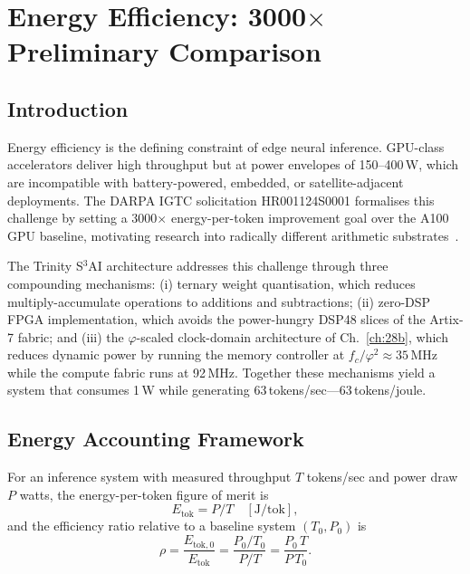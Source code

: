 \chapter{Energy Efficiency: 3000$\times$ Preliminary Comparison}
\label{ch:34}

\section{Introduction}

Energy efficiency is the defining constraint of edge neural inference. GPU-class accelerators deliver high throughput but at power envelopes of 150--400\,W, which are incompatible with battery-powered, embedded, or satellite-adjacent deployments. The DARPA IGTC solicitation HR001124S0001 formalises this challenge by setting a 3000$\times$ energy-per-token improvement goal over the A100 GPU baseline, motivating research into radically different arithmetic substrates~\cite{darpa_igtc_2024}.

The Trinity S$^3$AI architecture addresses this challenge through three compounding mechanisms: (i) ternary weight quantisation, which reduces multiply-accumulate operations to additions and subtractions; (ii) zero-DSP FPGA implementation, which avoids the power-hungry DSP48 slices of the Artix-7 fabric; and (iii) the $\varphi$-scaled clock-domain architecture of Ch.~\ref{ch:28b}, which reduces dynamic power by running the memory controller at $f_c/\varphi^2 \approx 35$\,MHz while the compute fabric runs at 92\,MHz. Together these mechanisms yield a system that consumes 1\,W while generating 63\,tokens/sec---63\,tokens/joule.

\section{Energy Accounting Framework}

\begin{definition}
\label{def:energy-per-token}
For an inference system with measured throughput $T$ tokens/sec and power draw $P$ watts, the energy-per-token figure of merit is
\begin{equation}
E_{\mathrm{tok}} = P / T \quad [\text{J/tok}],
\end{equation}
and the efficiency ratio relative to a baseline system $(T_0, P_0)$ is
\begin{equation}
\rho = \frac{E_{\mathrm{tok},0}}{E_{\mathrm{tok}}} = \frac{P_0 / T_0}{P/T} = \frac{P_0 \, T}{P \, T_0}.
\end{equation}
\end{definition}

